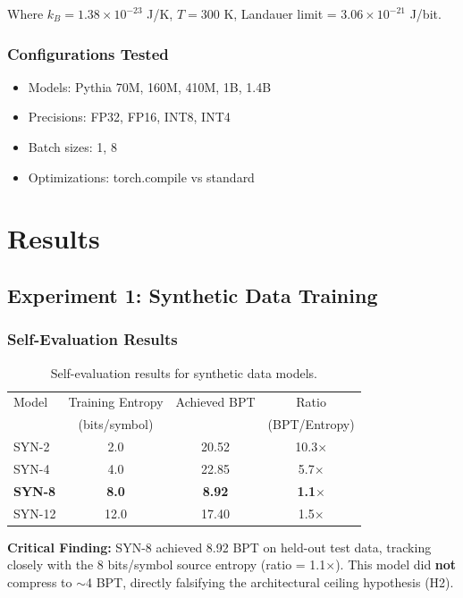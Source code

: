 \documentclass[11pt,a4paper]{article}
\begin{document}
Where $k_B = 1.38 \times 10^{-23}$ J/K, $T = 300$ K, Landauer limit = $3.06 \times 10^{-21}$ J/bit.

\subsubsection{Configurations Tested}

\begin{itemize}
\item Models: Pythia 70M, 160M, 410M, 1B, 1.4B
\item Precisions: FP32, FP16, INT8, INT4
\item Batch sizes: 1, 8
\item Optimizations: torch.compile vs standard
\end{itemize}

\section{Results}

\subsection{Experiment 1: Synthetic Data Training}

\subsubsection{Self-Evaluation Results}

\begin{table}[h]
\centering
\begin{tabular}{lccc}
\toprule
Model & Training Entropy & Achieved BPT & Ratio \\
 & (bits/symbol) & & (BPT/Entropy) \\
\midrule
SYN-2 & 2.0 & 20.52 & 10.3$\times$ \\
SYN-4 & 4.0 & 22.85 & 5.7$\times$ \\
\textbf{SYN-8} & \textbf{8.0} & \textbf{8.92} & \textbf{1.1$\times$} \\
SYN-12 & 12.0 & 17.40 & 1.5$\times$ \\
\bottomrule
\end{tabular}
\caption{Self-evaluation results for synthetic data models.}
\label{tab:syn-self-eval}
\end{table}

\textbf{Critical Finding:} SYN-8 achieved 8.92 BPT on held-out test data, tracking closely with the 8 bits/symbol source entropy (ratio = 1.1$\times$). This model did \textbf{not} compress to $\sim$4 BPT, directly falsifying the architectural ceiling hypothesis (H2).
\end{document}
